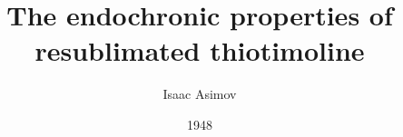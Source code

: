 \documentclass{article}
\title{The endochronic properties of resublimated thiotimoline}
\author{Isaac Asimov}
\date{1948}
\begin{document}
\makecoversheet\relax
\makefrontmatter\relax
\end{document}
